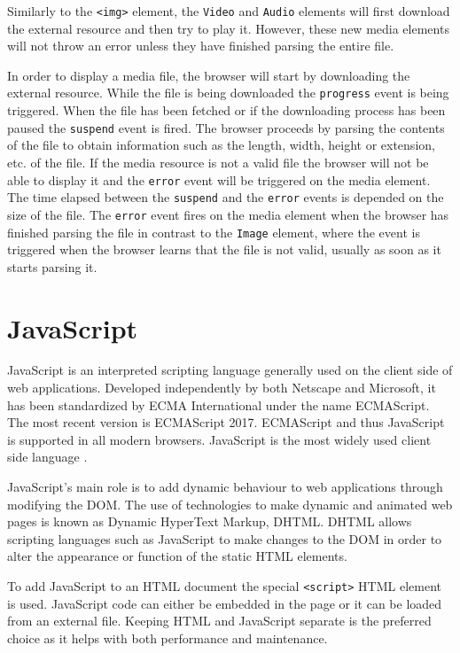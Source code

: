 \documentclass[10pt,a4paper,twoside]{book}
\begin{document}
Similarly to the \texttt{<img>} element, the \texttt{Video} and  \texttt{Audio} elements will first download the external resource and then try to play it. However, these new media elements will not throw an error unless they have finished parsing the entire file\cite{berjon2014html}.

In order to display a media file, the browser will start by downloading the external resource. While the file is being downloaded the \texttt{progress} event is being triggered. When the file has been fetched or if the downloading process has been paused the \texttt{suspend} event is fired. The browser proceeds by parsing the contents of the file to obtain information such as the length, width, height or extension, etc. of the file. If the media resource is not a valid file the browser will not be able to display it and the \texttt{error} event will be triggered on the media element. The time elapsed between the \texttt{suspend} and the \texttt{error} events is depended on the size of the file. The \texttt{error} event fires on the media element when the browser has finished parsing the file in contrast to the \texttt{Image} element, where the event is triggered when the browser learns that the file is not valid, usually as soon as it starts parsing it\cite{berjon2014html}.

\section{JavaScript}
\label{javascript}
JavaScript is an interpreted scripting language generally used on the client side of web applications. Developed independently by both Netscape and Microsoft, it has been standardized by ECMA International under the name ECMAScript.
The most recent version is ECMAScript 2017. ECMAScript and thus JavaScript is supported in all modern browsers. JavaScript is the most widely used client side language \cite{javascriptstats, javascriptabout}.

JavaScript's main role is to add dynamic behaviour to web applications through modifying the DOM. The use of technologies to make dynamic and animated web pages is known as Dynamic HyperText Markup, DHTML. DHTML allows scripting languages such as JavaScript to make changes to the DOM in order to alter the appearance or function of the static HTML elements.

To add JavaScript to an HTML document the special \texttt{<script>} HTML element is used. JavaScript code can either be embedded in the page or it can be loaded from an external file. Keeping HTML and JavaScript separate is the preferred choice as it helps with both performance and maintenance.
\end{document}
